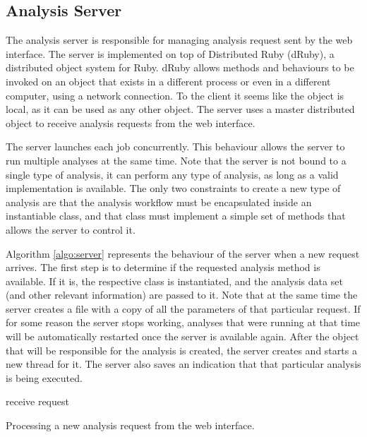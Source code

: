 \subsection{Analysis Server}

The analysis server is responsible for managing analysis request sent by the web
interface. The server is implemented on top of Distributed Ruby (dRuby), a
distributed object system for Ruby. dRuby allows methods and behaviours to be
invoked on an object that exists in a different process or even in a different
computer, using a network connection. To the client it seems like the object is
local, as it can be used as any other object. The server uses a master
distributed object to receive analysis requests from the web interface.

The server launches each job concurrently. This behaviour allows the server to
run multiple analyses at the same time. Note that the server is not bound to a
single type of analysis, it can perform any type of analysis, as long as a valid
implementation is available. The only two constraints to create a new type of
analysis are that the analysis workflow must be encapsulated inside an
instantiable class, and that class must implement a simple set of methods that
allows the server to control it.

Algorithm \ref{algo:server} represents the behaviour of the server when a new
request arrives. The first step is to determine if the requested analysis method
is available. If it is, the respective class is instantiated, and the analysis
data set (and other relevant information) are passed to it. Note that at the
same time the server creates a file with a copy of all the parameters of that
particular request. If for some reason the server stops working, analyses that
were running at that time will be automatically restarted once the server is
available again. After the object that will be responsible for the analysis is
created, the server creates and starts a new thread for it. The server also
saves an indication that that particular analysis is being executed.

\begin{algorithm}
  \LinesNumbered

  receive request\;
  \BlankLine

  \caption[Processing a new analysis request from the web interface]{
    Processing a new analysis request from the web interface.
  }
  \label{algo:server}
\end{algorithm}

